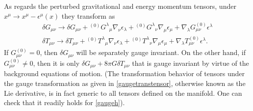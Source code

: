 As regards the perturbed gravitational and energy momentum tensors, under $x^\mu \to x^\mu - \epsilon^\mu(x)$ they transform as
\begin{eqnarray}
\delta G_{\mu\nu} \to \delta G_{\mu\nu} + {}^{(0)}G^\lambda{}_\mu \nabla_\nu \epsilon_\lambda +  {}^{(0)}G^{\lambda}{}_{\nu}\nabla_\mu \epsilon_\mu + \nabla_\lambda  G^{(0)}_{\mu\nu} \epsilon^\lambda
\nonumber\\
\delta T_{\mu\nu} \to \delta T_{\mu\nu} + {}^{(0)}T^\lambda{}_\mu \nabla_\nu \epsilon_\lambda +  {}^{(0)}T^{\lambda}{}_{\nu}\nabla_\mu \epsilon_\mu + \nabla_\lambda  T^{(0)}_{\mu\nu} \epsilon^\lambda.
\label{gaugetranstensor}
\end{eqnarray}
If $G_{\mu\nu}^{(0)}=0$, then $\delta G_{\mu\nu}$ will be separately gauge invariant. On the other hand, if $ G_{\mu\nu}^{(0)} \ne 0$, then it is only $\delta G_{\mu\nu} + 8\pi G \delta T_{\mu\nu}$ that is gauge invariant by virtue of the background equations of motion. (The transformation behavior of tensors under the gauge transformation as given in \eqref{gaugetranstensor}, otherwise known as the Lie derivative, is in fact generic to all tensors defined on the manifold. One can check that it readily holds for \eqref{gaugeh}). 

